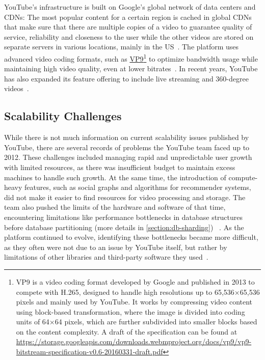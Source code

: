 \noindent YouTube's infrastructure is built on Google's global network of data centers and \ac{CDN}s: The most popular content for a certain region is cached in global \ac{CDN}s that make sure that there are multiple copies of a video to guarantee quality of service, reliability and closeness to the user while the other videos are stored on separate servers in various locations, mainly in the US~\parencite{youtube_architecture_2}. The platform uses advanced video coding formats, such as \href{https://developers.google.com/media/vp9}{VP9}\footnote{VP9 is a video coding format developed by Google and published in 2013 to compete with H.265, designed to handle high resolutions up to 65,536×65,536 pixels and mainly used by YouTube. It works by compressing video content using block-based transformation, where the image is divided into coding units of 64×64 pixels, which are further subdivided into smaller blocks based on the content complexity. A draft of the specification can be found at \url{https://storage.googleapis.com/downloads.webmproject.org/docs/vp9/vp9-bitstream-specification-v0.6-20160331-draft.pdf}} to optimize bandwidth usage while maintaining high video quality, even at lower bitrates~\parencite{youtube_vpu}. 
In recent years, YouTube has also expanded its feature offering to include live streaming and 360-degree videos~\parencite{youtube_live}.




\subsection{Scalability Challenges}\label{subsection:yt-scalability-challenges}

While there is not much information on current scalability issues published by YouTube, there are several records of problems the YouTube team faced up to 2012. These challenges included managing rapid and unpredictable user growth with limited resources, as there was insufficient budget to maintain excess machines to handle such growth. At the same time, the introduction of compute-heavy features, such as social graphs and algorithms for recommender systems, did not make it easier to find resources for video processing and storage. The team also pushed the limits of the hardware and software of that time, encountering limitations like performance bottlenecks in database structures before database partitioning (more details in \autoref{section:db-sharding}) ~\parencite{youtube_challenges}. As the platform continued to evolve, identifying these bottlenecks became more difficult, as they often were not due to an issue by YouTube itself, but rather by limitations of other libraries and third-party software they used~\parencite{youtube_challenges_2}.

